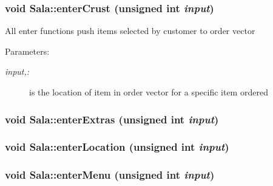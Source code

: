 \hypertarget{class_sala_ae3b8375ca0ab5b62e84f86582b8cec3}{
\subsubsection[enterCrust]{\setlength{\rightskip}{0pt plus 5cm}void Sala::enter\-Crust (unsigned int {\em input})}}
\label{class_sala_ae3b8375ca0ab5b62e84f86582b8cec3}


All enter functions push items selected by customer to order vector

\begin{Desc}
\item[Parameters:]
\begin{description}
\item[{\em input,:}]is the location of item in order vector for a specific item ordered \end{description}
\end{Desc}
\hypertarget{class_sala_f4637151f3f934bdf727685020e956e2}{
\subsubsection[enterExtras]{\setlength{\rightskip}{0pt plus 5cm}void Sala::enter\-Extras (unsigned int {\em input})}}
\label{class_sala_f4637151f3f934bdf727685020e956e2}


\hypertarget{class_sala_d5b546b927926e2eed280fcdc087135e}{
\subsubsection[enterLocation]{\setlength{\rightskip}{0pt plus 5cm}void Sala::enter\-Location (unsigned int {\em input})}}
\label{class_sala_d5b546b927926e2eed280fcdc087135e}


\hypertarget{class_sala_1015bfdd699f9dc90a677a87def0b37b}{
\subsubsection[enterMenu]{\setlength{\rightskip}{0pt plus 5cm}void Sala::enter\-Menu (unsigned int {\em input})}}
\label{class_sala_1015bfdd699f9dc90a677a87def0b37b}


